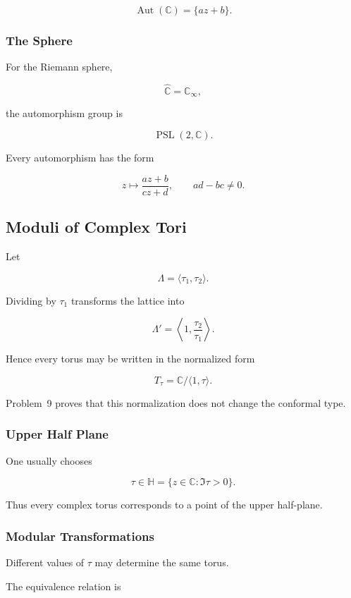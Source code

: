 \documentclass[12pt,a4paper]{article}
\theoremstyle{notespace}
\begin{document}
\[
\operatorname{Aut}(\mathbb C)
=
\{az+b\}.
\]

\subsubsection*{The Sphere}

For the Riemann sphere,

\[
\widehat{\mathbb C}
=
\mathbb C_\infty,
\]

the automorphism group is

\[
\operatorname{PSL}(2,\mathbb C).
\]

Every automorphism has the form

\[
z
\longmapsto
\frac{az+b}{cz+d},
\qquad
ad-bc\neq0.
\]

\bigskip

\subsection{ Moduli of Complex Tori}

Let

\[
\Lambda
=
\langle\tau_1,\tau_2\rangle.
\]

Dividing by \(\tau_1\) transforms the lattice into

\[
\Lambda'
=
\left\langle
1,
\frac{\tau_2}{\tau_1}
\right\rangle.
\]

Hence every torus may be written in the normalized form

\[
T_\tau
=
\mathbb C/\langle1,\tau\rangle.
\]

Problem~9 proves that this normalization does not change the conformal type.

\subsubsection*{Upper Half Plane}

One usually chooses

\[
\tau\in\mathbb H
=
\{z\in\mathbb C:\Im\tau>0\}.
\]

Thus every complex torus corresponds to a point of the upper half-plane.

\subsubsection*{Modular Transformations}

Different values of \(\tau\) may determine the same torus.

The equivalence relation is
\end{document}
